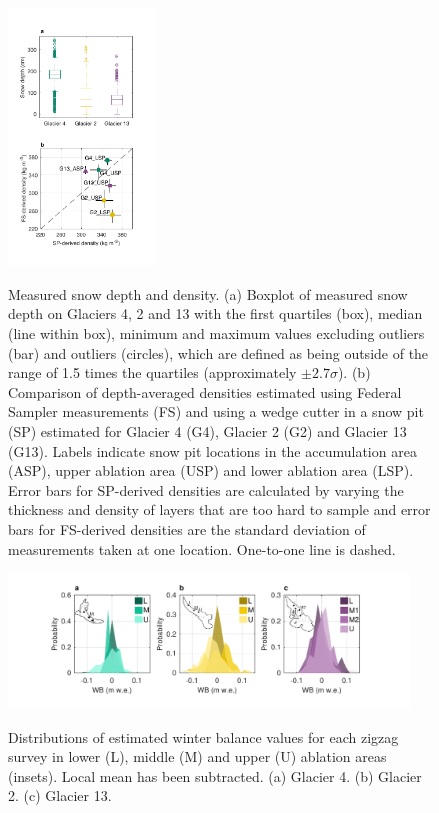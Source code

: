 \documentclass[review,oneside, letterpaper]{igs}
\begin{document}
\begin{figure}
	\centering
	\includegraphics[width =0.35\textwidth]{DepthBoxplot_SPvsFS.pdf}\\
	\caption{Measured snow depth and density. (a) Boxplot of measured snow depth on Glaciers 4, 2 and 13 with the first quartiles (box), median (line within box), minimum and maximum values excluding outliers (bar) and outliers (circles), which are defined as being outside of the range of 1.5 times the quartiles (approximately $\pm2.7\sigma$). (b) Comparison of depth-averaged densities estimated using Federal Sampler measurements (FS) and using a wedge cutter in a snow pit (SP) estimated for Glacier 4 (G4), Glacier 2 (G2) and Glacier 13 (G13). Labels indicate snow pit locations in the accumulation area (ASP), upper ablation area (USP) and lower ablation area (LSP). Error bars for SP-derived densities are calculated by varying the thickness and density of layers that are too hard to sample and error bars for FS-derived densities are the standard deviation of measurements taken at one location. One-to-one line is dashed.}
	\label{fig:DepthBoxplot_SPvsFS}
\end{figure}

\begin{figure}
	\centering
	\includegraphics[width =0.95\textwidth]{ZigzagHistogram.pdf}\\
	\caption{Distributions of estimated winter balance values for each zigzag survey in lower (L), middle (M) and upper (U) ablation areas (insets). Local mean has been subtracted. (a) Glacier 4. (b) Glacier 2. (c) Glacier 13.}
	\label{fig:ZigzagHistogram}
\end{figure}
\end{document}
